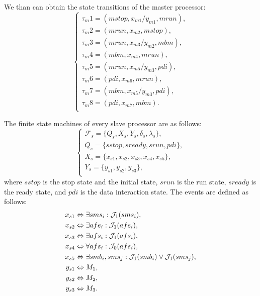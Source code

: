 \documentclass[journal,UTF8]{IEEEtran}
\begin{document}
	We than can obtain the state transitions of the master processor:
	\begin{equation}
	\left\{
	\begin{array}{l}
	\tau_m1 = (mstop, x_{m1}/y_{m1}, mrun),\\
	\tau_m2 = (mrun, x_{m2}, mstop),\\
	\tau_m3 = (mrun, x_{m3}/y_{m2}, mbm),\\
	\tau_m4 = (mbm, x_{m4}, mrun),\\
	\tau_m5 = (mrun, x_{m5}/y_{m3}, pdi),\\
	\tau_m6 = (pdi, x_{m6}, mrun),\\
	\tau_m7 = (mbm, x_{m5}/y_{m3}, pdi),\\
	\tau_m8 = (pdi, x_{m7}, mbm).\\
	\end{array}
	\right.
	\end{equation}
	
	
	The finite state machines of every slave processor are as follows:
	\begin{equation}
	\label{FSlave}
	\left\{
	\begin{array}{l}
	\mathcal{F}_{s} = \{Q_s, X_s, Y_s, \delta_s, \lambda_s\},\\
	Q_s = \{sstop, sready, srun, pdi\},\\
	X_s = \{x_{s1}, x_{s2}, x_{s3}, x_{s4}, x_{s5}\},\\
	Y_s = \{y_{s1}, y_{s2}, y_{s3}\},\\
	\end{array}
	\right.
	\end{equation}
	where $sstop$ is the stop state and the initial state, $srun$ is the run state, $sready$ is the ready state, and $pdi$ is the data interaction state. The events are defined as follows:
	\begin{align}
	\notag x_{s1}&\Leftrightarrow \exists sms_i: \mathcal{J}_1(sms_i),\\
	\notag x_{s2}&\Leftrightarrow \exists afe_i: \mathcal{J}_1(afe_i),\\
	\notag x_{s3}&\Leftrightarrow \exists afs_i: \mathcal{J}_1(afs_i),\\
	\notag x_{s4}&\Leftrightarrow \forall afs_i: \mathcal{J}_0(afs_i),\\
	\notag x_{s5}&\Leftrightarrow \exists smb_i, sms_j: \mathcal{J}_1(smb_i) \lor \mathcal{J}_1(sms_j),\\
	\notag y_{s1}&\Leftrightarrow M_1,\\
	\notag y_{s2}&\Leftrightarrow M_2,\\
	\notag y_{s3}&\Leftrightarrow M_3.
	\end{align}
	
\end{document}
